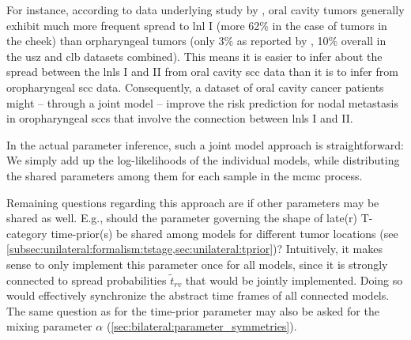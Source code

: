 \documentclass[\relativeRoot/main.tex]{subfiles}
\begin{document}
For instance, according to data underlying study by , oral cavity tumors generally exhibit much more frequent spread to \gls{lnl} I (more 62\% in the case of tumors in the cheek) than orpharyngeal tumors (only 3\% as reported by , 10\% overall in the \gls{usz} and \gls{clb} datasets combined). This means it is easier to infer about the spread between the \glspl{lnl} I and II from oral cavity \gls{scc} data than it is to infer from oropharyngeal \gls{scc} data. Consequently, a dataset of oral cavity cancer patients might -- through a joint model -- improve the risk prediction for nodal metastasis in oropharyngeal \glspl{scc} that involve the connection between \glspl{lnl} I and II.

In the actual parameter inference, such a joint model approach is straightforward: We simply add up the log-likelihoods of the individual models, while distributing the shared parameters among them for each sample in the \gls{mcmc} process.

Remaining questions regarding this approach are if other parameters may be shared as well. E.g., should the parameter governing the shape of late(r) T-category time-prior(s) be shared among models for different tumor locations (see \cref{subsec:unilateral:formalism:tstage,sec:unilateral:tprior})? Intuitively, it makes sense to only implement this parameter once for all models, since it is strongly connected to spread probabilities $\tilde{t}_{rv}$ that would be jointly implemented. Doing so would effectively synchronize the abstract time frames of all connected models. The same question as for the time-prior parameter may also be asked for the mixing parameter $\alpha$ (\cref{sec:bilateral:parameter_symmetries}).
\end{document}
